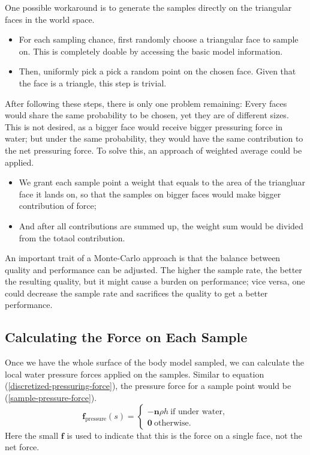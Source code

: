 One possible workaround is to generate the samples directly on the triangular faces in the world space.
\begin{itemize}
	\item For each sampling chance, first randomly choose a triangular face to sample on.
		This is completely doable by accessing the basic model information.
	\item Then, uniformly pick a pick a random point on the chosen face.
		Given that the face is a triangle, this step is trivial.
\end{itemize}

After following these steps, there is only one problem remaining:
Every faces would share the same probability to be chosen, yet they are of different sizes.
This is not desired, as a bigger face would receive bigger pressuring force in water;
but under the same probability, they would have the same contribution to the net pressuring force.
To solve this, an approach of weighted average could be applied.
\begin{itemize}
	\item We grant each sample point a weight that equals to the area of the triangluar face it lands on, so that the samples on bigger faces would make bigger contribution of force;
	\item And after all contributions are summed up, the weight sum would be divided from the totaol contribution.
\end{itemize}

An important trait of a Monte-Carlo approach is that the balance between quality and performance can be adjusted.
The higher the sample rate, the better the resulting quality, but it might cause a burden on performance;
vice versa, one could decrease the sample rate and sacrifices the quality to get a better performance.

\subsection{Calculating the Force on Each Sample}

Once we have the whole surface of the body model sampled, we can calculate the local water pressure forces applied on the samples.
Similar to equation (\ref{discretized-pressuring-force}), the pressure force for a sample point would be (\ref{sample-pressure-force}).
\begin{equation}
	\mathbf{f}_{\text{pressure}}(s)=
	\begin{cases}
		-\mathbf{n}\rho h \ \text{if under water}, \\
		\mathbf{0} \ \text{otherwise}.
	\end{cases}
	\label{sample-pressure-force}
\end{equation}
Here the small $\mathbf{f}$ is used to indicate that this is the force on a single face, not the net force.

